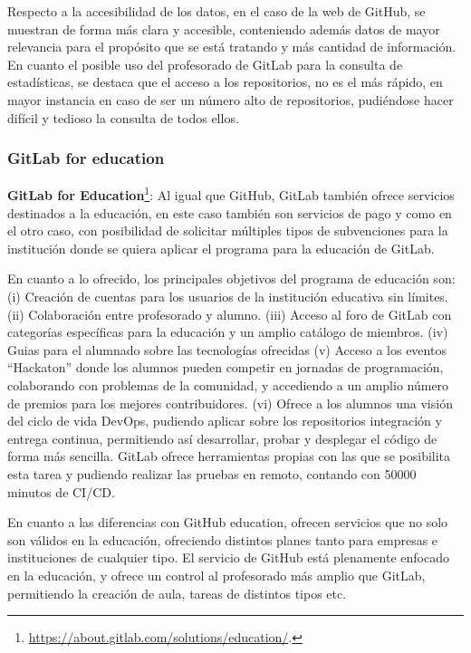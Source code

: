 Respecto a la accesibilidad de los datos, en el caso de la web de GitHub,
se muestran de forma más clara y accesible, conteniendo además datos de
mayor relevancia para el propósito que se está tratando y más cantidad de
información. En cuanto el posible uso del profesorado de GitLab para la
consulta de estadísticas, se destaca que el acceso a los repositorios, no
es el más rápido, en mayor instancia en caso de ser un número alto de
repositorios, pudiéndose hacer difícil y tedioso la consulta de todos
ellos.

\subsubsection{GitLab for education}

\textbf{GitLab for
  Education}\footnote{\url{https://about.gitlab.com/solutions/education/}.}:
Al igual que GitHub, GitLab también ofrece servicios destinados a la
educación, en este caso también son servicios de pago y como en el otro
caso, con posibilidad de solicitar múltiples tipos de subvenciones para la
institución donde se quiera aplicar el programa para la educación de
GitLab.

En cuanto a lo ofrecido, los principales objetivos del programa de
educación son: (i) Creación de cuentas para los usuarios de la institución
educativa sin límites. (ii) Colaboración entre profesorado y alumno. (iii)
Acceso al foro de GitLab con categorías específicas para la educación y un
amplio catálogo de miembros. (iv) Guias para el alumnado sobre las
tecnologías ofrecidas (v) Acceso a los eventos “Hackaton” donde los alumnos
pueden competir en jornadas de programación, colaborando con problemas de
la comunidad, y accediendo a un amplio número de premios para los mejores
contribuidores. (vi) Ofrece a los alumnos una visión del ciclo de vida DevOps, pudiendo aplicar sobre los repositorios integración y entrega continua, permitiendo así desarrollar, probar y desplegar el código de forma más sencilla. GitLab ofrece herramientas propias con las que se posibilita esta tarea y pudiendo realizar las pruebas en remoto, contando con 50000 minutos de CI/CD. 


En cuanto a las diferencias con GitHub education, ofrecen servicios que no
solo son válidos en la educación, ofreciendo distintos planes tanto para
empresas e instituciones de cualquier tipo. El servicio de GitHub está
plenamente enfocado en la educación, y ofrece un control al profesorado más
amplio que GitLab, permitiendo la creación de aula, tareas de distintos
tipos etc.


